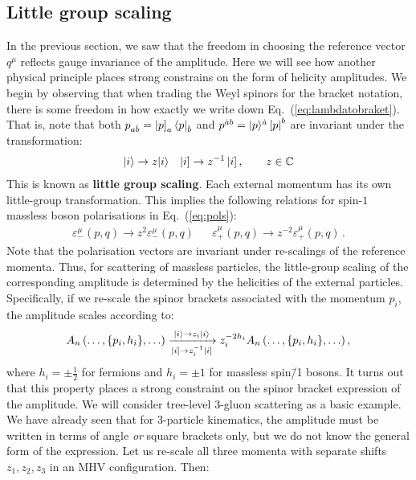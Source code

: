 \documentclass[main.tex]{subfiles}
\begin{document}
\subsection{Little group scaling} \label{sec:littlegroup}
In the previous section, we saw that the freedom in choosing the reference vector $q^\mu$ reflects gauge invariance of the amplitude. Here we will see how another physical principle places strong constrains on the form of helicity amplitudes. We begin by observing that when trading the Weyl spinors for the bracket notation, there is some freedom in how exactly we write down Eq.~(\ref{eq:lambdatobraket}). That is, note that both $p_{a\dot{b}} = \left| p \right]_a \langle p|_{\dot{b}}$ and $p^{\dot{a}b} = |p \rangle^{\dot{a}} \left[ p \right|^b$ are invariant under the transformation:
\begin{align} \label{eq:littlegroupscaling}
    |i \rangle \rightarrow z |i \rangle && \left| i \right] \rightarrow z^{-1} \left| i \right], \qquad z \in \mathbb{C}  
\end{align}
This is known as \textbf{little group scaling}. Each external momentum has its own little-group transformation. This implies the following relations for spin-$1$ massless boson polarisations in Eq.~(\ref{eq:pols}):
\begin{align}
    \varepsilon^\mu_- (p,q) \rightarrow z^2 \varepsilon^\mu_- (p,q) &&  \varepsilon^\mu_+ (p,q) \rightarrow z^{-2} \varepsilon^\mu_+ (p,q) \,.
\end{align}
Note that the polarisation vectors are invariant under re-scalings of the reference momenta. Thus, for scattering of massless particles, the little-group scaling of the corresponding amplitude is determined by the helicities of the external particles. Specifically, if we re-scale the spinor brackets associated with the momentum $p_i$, the amplitude scales according to:
\begin{equation}
    A_n \left(\ldots, \{p_i, h_i\}, \ldots \right) \xrightarrow[\ketsq{i} \rightarrow z_i^{-1}\ketsq{i}]{\ket{i} \rightarrow z_i\ket{i}} z_i^{-2h_i}  A_n \left(\ldots, \{p_i, h_i\}, \ldots \right),
\end{equation}
where $h_i=\pm\frac{1}{2}$ for fermions and $h_i=\pm1$ for massless spin\=/1 bosons. It turns out that this property places a strong constraint on the spinor bracket expression of the amplitude. We will consider tree-level 3-gluon scattering as a basic example. We have already seen that for 3-particle kinematics, the amplitude must be written in terms of angle \textit{or} square brackets only, but we do not know the general form of the expression. Let us re-scale all three momenta with separate shifts $z_1, z_2, z_3$ in an MHV configuration. Then:
\end{document}
